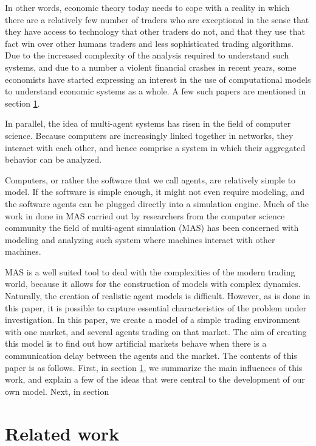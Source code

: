 In other words, economic theory today needs to cope with a reality in which there are a relatively few number of traders who are exceptional in the sense that they have access to technology that other traders do not, and that they use that fact win over other humans traders and less sophisticated trading algorithms. Due to the increased complexity of the analysis required to understand such systems, and due to a number a violent financial crashes in recent years, some economists have started expressing an interest in the use of computational models to understand economic systems as a whole. A few such papers are mentioned in section \ref{section_relatedWork}.

In parallel, the idea of multi-agent systems has risen in the field of computer science. Because computers are increasingly linked together in networks, they interact with each other, and hence comprise a system in which their aggregated behavior can be analyzed. 

Computers, or rather the software that we call agents, are relatively simple to model. If the software is simple enough, it might not even require modeling, and the software agents can be plugged directly into a simulation engine. Much of the work in done in MAS carried out by researchers from the computer science community the field of multi-agent simulation (MAS) has been concerned with modeling and analyzing such system where machines interact with other machines. 
 
MAS is a well suited tool to deal with the complexities of the modern trading world, because it allows for the construction of models with complex dynamics. Naturally, the creation of realistic agent models is difficult. However, as is done in this paper, it is possible to capture essential characteristics of the problem under investigation. In this paper, we create a model of a simple trading environment with one market, and several agents trading on that market. The aim of creating this model is to find out how artificial markets behave when there is a communication delay between the agents and the market. The contents of this paper is as follows. First, in section \ref{section_relatedWork}, we summarize the main influences of this work, and explain a few of the ideas that were central to the development of our own model. Next, in section 

\section{Related work}\label{section_relatedWork}

